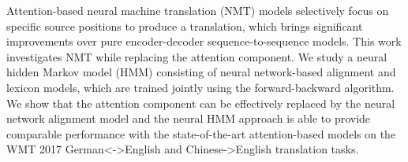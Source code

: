 Attention-based neural machine translation (NMT) models selectively focus on specific source positions to produce a translation, which brings significant improvements over pure encoder-decoder sequence-to-sequence models. This work investigates NMT while replacing the attention component. We study a neural hidden Markov model (HMM) consisting of neural network-based alignment and lexicon models, which are trained jointly using the forward-backward algorithm. We show that the attention component can be effectively replaced by the neural network alignment model and the neural HMM approach is able to provide comparable performance with the state-of-the-art attention-based models on the WMT 2017 German<->English and Chinese->English translation tasks.
